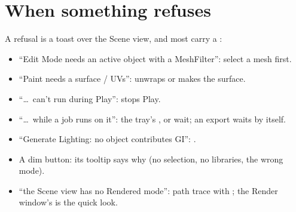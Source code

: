 \section{When something refuses}
A refusal is a toast over the Scene view, and most carry a :
\begin{itemize}
  \item ``Edit Mode needs an active object with a MeshFilter'': select a mesh first.
  \item ``Paint needs a surface / UVs'':  unwraps or makes the surface.
  \item ``\ldots\ can't run during Play'':  stops Play.
  \item ``\ldots\ while a job runs on it'': the tray's , or wait; an export waits by itself.
  \item ``Generate Lighting: no object contributes GI'': .
  \item A dim button: its tooltip says why (no selection, no libraries, the wrong mode).
  \item ``the Scene view has no Rendered mode'': path trace with ; the Render window's  is the quick look.
\end{itemize}

